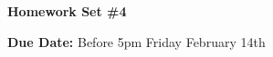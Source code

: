 


\thispagestyle{fancy}






\begin{center}
{\huge \textbf{Homework Set \#4}}
\large

{\textbf{ Due Date:} Before 5pm Friday February 14th  } 
\end{center}

